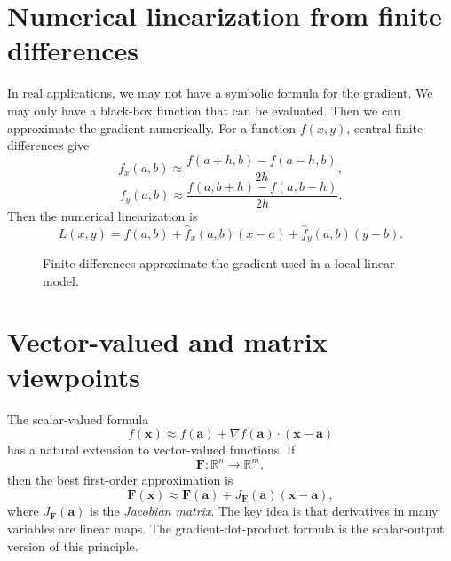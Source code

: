 \documentclass[11pt]{article}
\newcommand{\R}{\mathbb R}
\newcommand{\grad}{\nabla}
\begin{document}
\section{Numerical linearization from finite differences}

In real applications, we may not have a symbolic formula for the gradient. We may only have a black-box function that can be evaluated. Then we can approximate the gradient numerically. For a function $f(x,y)$, central finite differences give
\[
f_x(a,b)\approx \frac{f(a+h,b)-f(a-h,b)}{2h},
\]
\[
f_y(a,b)\approx \frac{f(a,b+h)-f(a,b-h)}{2h}.
\]
Then the numerical linearization is
\[
L(x,y)=f(a,b)+\widehat f_x(a,b)(x-a)+\widehat f_y(a,b)(y-b).
\]

\begin{figure}[H]
\centering
{}
\caption{Finite differences approximate the gradient used in a local linear model.}
\end{figure}

\section{Vector-valued and matrix viewpoints}

The scalar-valued formula
\[
f(\mathbf{x})\approx f(\mathbf{a})+\grad f(\mathbf{a})\cdot(\mathbf{x}-\mathbf{a})
\]
has a natural extension to vector-valued functions. If
\[
\mathbf F:\R^n\to\R^m,
\]
then the best first-order approximation is
\[
\mathbf F(\mathbf{x})\approx \mathbf F(\mathbf{a})+J_{\mathbf F}(\mathbf{a})(\mathbf{x}-\mathbf{a}),
\]
where $J_{\mathbf F}(\mathbf{a})$ is the \emph{Jacobian matrix}. The key idea is that derivatives in many variables are linear maps. The gradient-dot-product formula is the scalar-output version of this principle.
\end{document}
